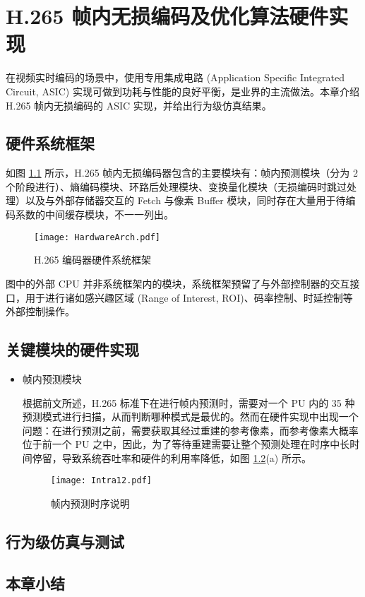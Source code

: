\chapter{H.265 帧内无损编码及优化算法硬件实现}
\label{cha:c4}
在视频实时编码的场景中，使用专用集成电路 (Application Specific Integrated Circuit, ASIC) 实现可做到功耗与性能的良好平衡，是业界的主流做法。本章介绍 H.265 帧内无损编码的 ASIC 实现，并给出行为级仿真结果。

\section{硬件系统框架}
如图 \ref{fig:HardwareArch} 所示，H.265 帧内无损编码器包含的主要模块有：帧内预测模块（分为 2 个阶段进行）、熵编码模块、环路后处理模块、变换量化模块（无损编码时跳过处理）以及与外部存储器交互的 Fetch 与像素 Buffer 模块，同时存在大量用于待编码系数的中间缓存模块，不一一列出。
\begin{figure}[hbt]
    \centering
    \texttt{[image: HardwareArch.pdf]}
    \caption{H.265 编码器硬件系统框架}
    \label{fig:HardwareArch}
\end{figure}

图中的外部 CPU 并非系统框架内的模块，系统框架预留了与外部控制器的交互接口，用于进行诸如感兴趣区域 (Range of Interest, ROI)、码率控制、时延控制等外部控制操作。

\section{关键模块的硬件实现}
\begin{itemize}
    \item 帧内预测模块

          根据前文所述，H.265 标准下在进行帧内预测时，需要对一个 PU 内的 35 种预测模式进行扫描，从而判断哪种模式是最优的。然而在硬件实现中出现一个问题：在进行预测之前，需要获取其经过重建的参考像素，而参考像素大概率位于前一个 PU 之中，因此，为了等待重建需要让整个预测处理在时序中长时间停留，导致系统吞吐率和硬件的利用率降低，如图 \ref{fig:Intra12}(a) 所示。
          \begin{figure}[hbt]
              \centering
              \texttt{[image: Intra12.pdf]}
              \caption{帧内预测时序说明}
              \label{fig:Intra12}
          \end{figure}
\end{itemize}

\section{行为级仿真与测试}

\section{本章小结}